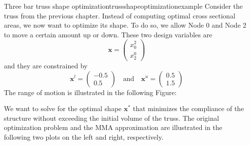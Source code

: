 \begin{example}{Three bar truss shape optimization}{trussshapeoptimizationexample}
    Consider the truss from the previous chapter. Instead of computing optimal cross sectional areas, we now want to optimize its shape. To do so, we allow Node 0 and Node 2 to move a certain amount up or down. These two design variables are 
    \begin{equation}
        \mathbf{x} = 
        \begin{pmatrix}
            x_0^2 \\ x_2^0
        \end{pmatrix}
    \end{equation}
    and they are constrained by 
    \begin{equation}
        \mathbf{x}^l = 
        \begin{pmatrix}
             -0.5\\ 0.5
        \end{pmatrix} 
        \quad 
        \text{and}
        \quad
        \mathbf{x}^u = 
        \begin{pmatrix}
             0.5\\ 1.5
        \end{pmatrix} 
    \end{equation}
    The range of motion is illustrated in the following Figure:
    \begin{center}
        
    \end{center}

    We want to solve for the optimal shape $\mathbf{x}^*$ that minimizes the compliance of the structure without exceeding the initial volume of the truss. The original optimization problem and the MMA approximation are illustrated in the following two plots on the left and right, respectively.

    \begin{minipage}{.5\textwidth}
        \centering
        
    \end{minipage}%
    \begin{minipage}{.5\textwidth}
        \centering
        
    \end{minipage}


\end{example}
